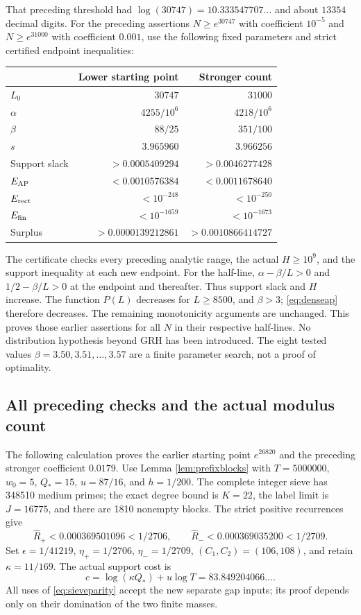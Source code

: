 \documentclass[11pt]{article}
\begin{document}
That preceding threshold had $\log(30747)=10.333547707\ldots$
and about $13354$ decimal digits.
For the preceding assertions $N\ge e^{30747}$ with coefficient $10^{-5}$
and $N\ge e^{31000}$ with coefficient $0.001$, use the following
fixed parameters and strict certified endpoint inequalities:
\begin{center}
\begin{tabular}{lrr}\toprule
 & Lower starting point & Stronger count\\\midrule
$L_0$ & $30747$ & $31000$\\
$\alpha$ & $4255/10^6$ & $4218/10^6$\\
$\beta$ & $88/25$ & $351/100$\\
$s$ & $3.965960$ & $3.966256$\\
Support slack & $>0.0005409294$ & $>0.0046277428$\\
$E_{\rm AP}$ & $<0.0010576384$ & $<0.0011678640$\\
$E_{\rm rect}$ & $<10^{-248}$ & $<10^{-250}$\\
$E_{\rm fin}$ & $<10^{-1659}$ & $<10^{-1673}$\\
Surplus & $>0.0000139212861$ & $>0.0010866414727$\\\bottomrule
\end{tabular}
\end{center}
The certificate checks every preceding analytic range, the actual
$H\ge10^9$, and the support inequality at each new endpoint.
For the half-line, $\alpha-\beta/L>0$ and
$1/2-\beta/L>0$ at the endpoint and thereafter. Thus support slack
and $H$ increase. The function $P(L)$ decreases for
$L\ge8500$, and $\beta>3$; \eqref{eq:denseap} therefore decreases.
The remaining monotonicity arguments are unchanged.
This proves those earlier assertions for all $N$ in their respective half-lines.
No distribution hypothesis beyond GRH has been introduced.
The eight tested values $\beta=3.50,3.51,\ldots,3.57$ are a finite
parameter search, not a proof of optimality.

\subsection{All preceding checks and the actual modulus count}\label{sec:prefixgrh}
The following calculation proves the earlier starting point $e^{26820}$
and the preceding stronger coefficient $0.0179$.
Use Lemma \ref{lem:prefixblocks} with $T=5000000$, $w_0=5$,
$Q_*=15$, $u=87/16$, and $h=1/200$.
The complete integer sieve has 348510 medium primes;
the exact degree bound is $K=22$, the label limit is $J=16775$,
and there are 1810 nonempty blocks. The strict positive recurrences give
\[
\widehat R_+<0.000369501096<1/2706,\qquad
\widehat R_-<0.000369035200<1/2709.
\]
Set $\epsilon=1/41219$, $\eta_+=1/2706$, $\eta_-=1/2709$,
$(C_1,C_2)=(106,108)$, and retain $\kappa=11/169$.
The actual support cost is
\[
c=\log(\kappa Q_*)+u\log T=83.849204066\ldots.
\]
All uses of \eqref{eq:sieveparity} accept the new separate gap inputs;
its proof depends only on their domination of the two finite masses.
\end{document}
